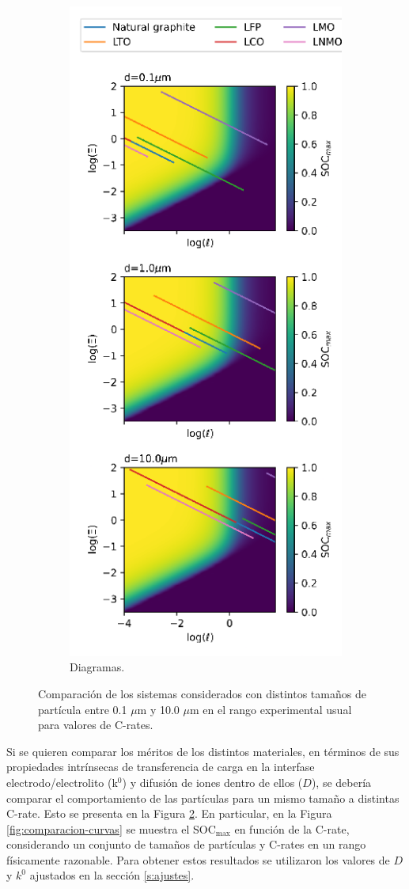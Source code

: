 \begin{figure}[h!]
\begin{subfigure}{.375\textwidth}
        \includegraphics[height=.4\textheight]{FastCharging/un/resultados/comparacion/comparacion-mapa.png}
        \caption{Diagramas.}
        \label{fig:comparacion-mapa}
    \end{subfigure}
    \caption{Comparación de los sistemas considerados con distintos tamaños de 
    partícula entre 0.1 $\mu$m y 10.0 $\mu$m en el rango experimental usual para 
    valores de C-rates.}
    \label{fig:comparacion}
\end{figure}

Si se quieren comparar los méritos de los distintos materiales, en términos de 
sus propiedades intrínsecas de transferencia de carga en la interfase 
electrodo/electrolito (k$^0$) y difusión de iones dentro de ellos ($D$), se 
debería comparar el comportamiento de las partículas para un mismo tamaño a 
distintas C-rate. Esto se presenta en la Figura \ref{fig:comparacion}. En 
particular, en la Figura \ref{fig:comparacion-curvas} se muestra el SOC$_{\max}$ 
en función de la C-rate, considerando un conjunto de tamaños de partículas y 
C-rates en un rango físicamente razonable. Para obtener estos resultados se 
utilizaron los valores de $D$ y $k^0$ ajustados en la sección \ref{s:ajustes}.

